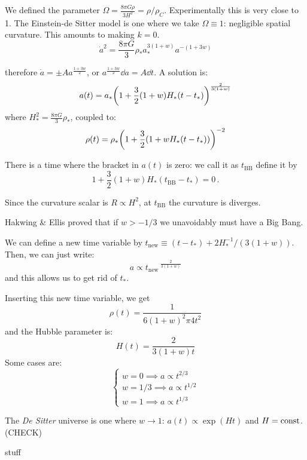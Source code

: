 \documentclass[main.tex]{subfiles}
\begin{document}
We defined the parameter \(\Omega = \frac{8 \pi G \rho}{3 H^2} = \rho / \rho_C\).
Experimentally this is very close to 1.
The Einstein-de Sitter model is one where we take \(\Omega \equiv 1\): negligible spatial curvature. This amounts to making \(k=0\).
\begin{equation}
  \dot{a}^2 = \frac{8 \pi G}{3} \rho_* a_{*}^{3 (1+w)} a^{-(1+3w)}
\end{equation}

therefore \(\dot{a} = \pm A a^{\frac{1+3w}{2}}\), or \(a ^{\frac{1+3w}{2}}\dd{a} = A \dd{t}\). A solution is:
\begin{equation}
  a(t)= a_{*} \qty(
    1 + \frac{3}{2} (1+w) H_{*} (t - t_{*})
  )^{\frac{2}{3(1+w)}}
\end{equation}
where \(H_{*}^2 = \frac{8 \pi G}{3} \rho_{*}\), coupled to:
\begin{equation}
  \rho(t) = \rho_{*} \qty(1 + \frac{3}{2}(1+w H_* (t-t_*)))^{-2}
\end{equation}

There is a time where the bracket in \(a(t)\) is zero: we call it as \(t_{\text{BB}}\) define it by
\begin{equation}
  1 + \frac{3}{2} (1+w) H_{*} (t_{\text{BB}} - t_* ) = 0\,.
\end{equation}

Since the curvature scalar is \(R \propto H^2\), at \(t_{\text{BB}}\)  the curvature is diverges.

Hakwing \& Ellis proved that if \(w>-1/3\) we unavoidably must have a Big Bang.

We can define a new time variable by \(t_{\text{new}} \equiv (t - t_{*}) + 2 H_*^{-1} / (3 (1+w))\). Then, we can just write:
\begin{equation}
  a \propto t_{\text{new}}\,^{\frac{2}{3(1+w)}}
\end{equation}
and this allows us to get rid of \(t_{*}\).

Inserting this new time variable, we get
\begin{equation}
  \rho(t) = \frac{1}{6 (1+w)^2 \pi 4 t^2}
\end{equation}
and the Hubble parameter is:
\begin{equation}
  H(t) = \frac{2}{3(1+w) t}
\end{equation}
Some cases are:
\begin{equation}
  \begin{cases}
      w = 0 \implies a \propto t^{2/3}  \\
      w=1/3 \implies a \propto t^{1/2} \\  
      w=1 \implies a \propto t^{1/3}  
  \end{cases}
\end{equation}

The \emph{De Sitter} universe is one where \(w \rightarrow 1\): \(a(t) \propto \exp(Ht) \) and \(H = \text{const}\). (CHECK) 

stuff
\end{document}
